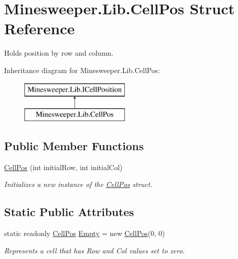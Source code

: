 \hypertarget{struct_minesweeper_1_1_lib_1_1_cell_pos}{\section{Minesweeper.\+Lib.\+Cell\+Pos Struct Reference}
\label{struct_minesweeper_1_1_lib_1_1_cell_pos}
}


Holds position by row and column.  


Inheritance diagram for Minesweeper.\+Lib.\+Cell\+Pos\+:\begin{figure}[H]
\begin{center}
\leavevmode
\includegraphics[height=2.000000cm]{struct_minesweeper_1_1_lib_1_1_cell_pos}
\end{center}
\end{figure}
\subsection*{Public Member Functions}
\begin{DoxyCompactItemize}
\item 
\hyperlink{struct_minesweeper_1_1_lib_1_1_cell_pos_afffd1dfab4648433c05d333afdbb563d}{Cell\+Pos} (int initial\+Row, int initial\+Col)
\begin{DoxyCompactList}\small\item\em Initializes a new instance of the \hyperlink{struct_minesweeper_1_1_lib_1_1_cell_pos}{Cell\+Pos} struct. \end{DoxyCompactList}\end{DoxyCompactItemize}
\subsection*{Static Public Attributes}
\begin{DoxyCompactItemize}
\item 
static readonly \hyperlink{struct_minesweeper_1_1_lib_1_1_cell_pos}{Cell\+Pos} \hyperlink{struct_minesweeper_1_1_lib_1_1_cell_pos_a27ef54d6b0afaaf63158d5b270be1afc}{Empty} = new \hyperlink{struct_minesweeper_1_1_lib_1_1_cell_pos}{Cell\+Pos}(0, 0)
\begin{DoxyCompactList}\small\item\em Represents a cell that has Row and Col values set to zero. \end{DoxyCompactList}\end{DoxyCompactItemize}
